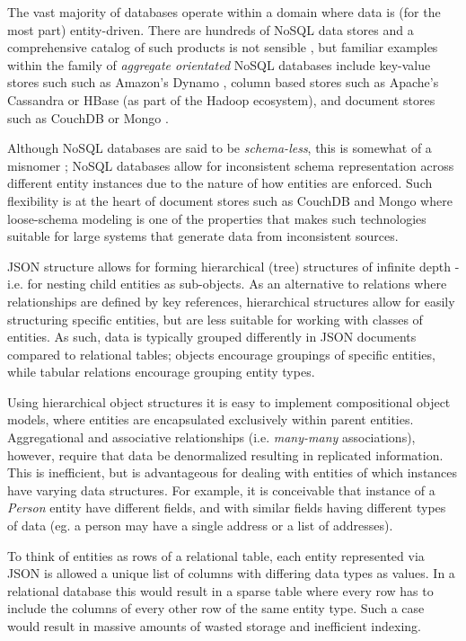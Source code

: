 The vast majority of databases operate within a domain where data is (for the most part) entity-driven. There are hundreds of NoSQL data stores and a comprehensive catalog of such products is not sensible \cite{GANESHCHANDRA201513}, but familiar examples within the family of \textit{aggregate orientated} NoSQL databases include key-value stores such such as Amazon's Dynamo \cite{sadalage2012}, column based stores such as Apache's Cassandra \cite{sadalage2012} or HBase \cite{sadalage2012} (as part of the Hadoop ecosystem), and document stores such as CouchDB or Mongo \cite{sadalage2012}.

Although NoSQL databases are said to be \textit{schema-less}, this is somewhat of a misnomer \cite{ATZENI2016}; NoSQL databases allow for inconsistent schema representation across different entity instances due to the nature of how entities are enforced. Such flexibility is at the heart of document stores such as CouchDB and Mongo where loose-schema modeling is one of the properties that makes such technologies suitable for large systems that generate data from inconsistent sources.

JSON structure allows for forming hierarchical (tree) structures of infinite depth - i.e. for nesting child entities as sub-objects. As an alternative to relations where relationships are defined by key references, hierarchical structures allow for easily structuring specific entities, but are less suitable for working with classes of entities. As such, data is typically grouped differently in JSON documents compared to relational tables; objects encourage groupings of specific entities, while tabular relations encourage grouping entity types.

Using hierarchical object structures it is easy to implement compositional object models, where entities are encapsulated exclusively within parent entities. Aggregational and associative relationships (i.e. \textit{many-many} associations), however, require that data be denormalized resulting in replicated information. This is inefficient, but is advantageous for dealing with entities of which instances have varying data structures. For example, it is conceivable that instance of a \textit{Person} entity have different fields, and with similar fields having different types of data (eg. a person may have a single address or a list of addresses).

To think of entities as rows of a relational table, each entity represented via JSON is allowed a unique list of columns with differing data types as values. In a relational database this would result in a sparse table where every row has to include the columns of every other row of the same entity type. Such a case would result in massive amounts of wasted storage and inefficient indexing.

